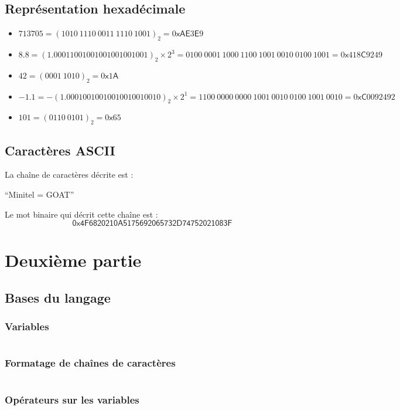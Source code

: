 \documentclass[../main.tex]{subfiles}
\begin{document}
\subsection{Représentation hexadécimale}
\begin{itemize}
	\item $713705 = (1010\ 1110\ 0011\ 1110\ 1001)_{2} = 0\textsf{xAE}3\textsf{E}9$
	\item $8.8 = (1.00011001001001001001001)_{2}\times 2^{3} = 0100\ 0001\ 1000\ 1100\ 1001\ 0010\ 0100\ 1001 = 0\textsf{x}418\textsf{C}9249$
	\item $42 = (0001\ 1010)_{2} = 0\textsf{x}1\textsf{A}$
	\item $-1.1 = -(1.00010010010010010010010)_2\times{2^1} = 1100\ 0000\ 0000\ 1001\ 0010\ 0100\ 1001\ 0010 = 0\textsf{xC}0092492$
	\item $101 = (0110\ 0101)_2 = 0\textsf{x}65$
\end{itemize}
\subsection{Caractères ASCII}
 La chaîne de caractères décrite est : 
\begin{center}
``Minitel = GOAT''
\end{center}
 Le mot binaire qui décrit cette chaîne est :
$$\textsf{0x4F6820210A5175692065732D74752021083F}$$
\section{Deuxième partie}
\subsection{Bases du langage}
\subsubsection{Variables}
\inputminted{c}{solutions/inter_var_side_effect.c}
\subsubsection{Formatage de chaînes de caractères}
\inputminted{c}{solutions/taille_types.c}
\subsubsection{Opérateurs sur les variables}
 
\end{document}
